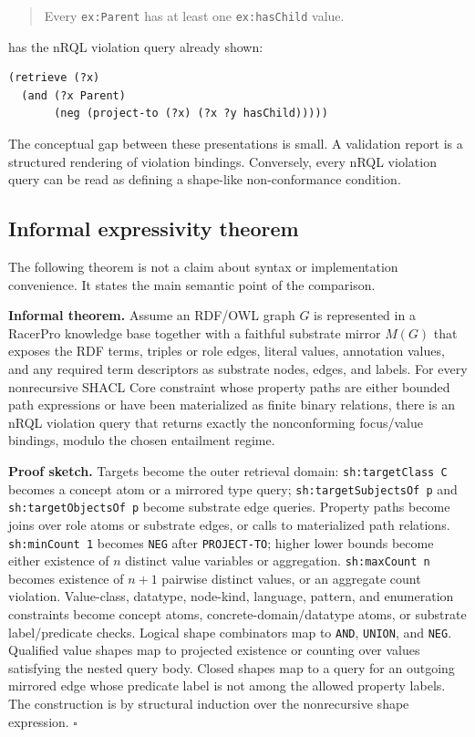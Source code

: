 \documentclass[11pt,letterpaper]{article}
\newcommand{\nrql}{nRQL}
\newcommand{\racer}{RacerPro}
\newcommand{\shacl}{SHACL}
\newcommand{\rdf}{RDF}
\newcommand{\owl}{OWL}
\begin{document}
\begin{quote}
Every \texttt{ex:Parent} has at least one \texttt{ex:hasChild} value.
\end{quote}

has the \nrql{} violation query already shown:

\begin{lstlisting}[language=nrql]
(retrieve (?x)
  (and (?x Parent)
       (neg (project-to (?x) (?x ?y hasChild)))))
\end{lstlisting}

The conceptual gap between these presentations is small. A validation report is a structured rendering of violation bindings. Conversely, every \nrql{} violation query can be read as defining a shape-like non-conformance condition.

\subsection{Informal expressivity theorem}

The following theorem is not a claim about syntax or implementation convenience. It states the main semantic point of the comparison.

\medskip
\noindent\textbf{Informal theorem.}
Assume an \rdf{}/\owl{} graph $G$ is represented in a \racer{} knowledge base together with a faithful substrate mirror $M(G)$ that exposes the \rdf{} terms, triples or role edges, literal values, annotation values, and any required term descriptors as substrate nodes, edges, and labels. For every nonrecursive \shacl{} Core constraint whose property paths are either bounded path expressions or have been materialized as finite binary relations, there is an \nrql{} violation query that returns exactly the nonconforming focus/value bindings, modulo the chosen entailment regime.

\medskip
\noindent\textbf{Proof sketch.}
Targets become the outer retrieval domain: \texttt{sh:targetClass C} becomes a concept atom or a mirrored type query; \texttt{sh:targetSubjectsOf p} and \texttt{sh:targetObjectsOf p} become substrate edge queries. Property paths become joins over role atoms or substrate edges, or calls to materialized path relations. \texttt{sh:minCount 1} becomes \texttt{NEG} after \texttt{PROJECT-TO}; higher lower bounds become either existence of $n$ distinct value variables or aggregation. \texttt{sh:maxCount n} becomes existence of $n+1$ pairwise distinct values, or an aggregate count violation. Value-class, datatype, node-kind, language, pattern, and enumeration constraints become concept atoms, concrete-domain/datatype atoms, or substrate label/predicate checks. Logical shape combinators map to \texttt{AND}, \texttt{UNION}, and \texttt{NEG}. Qualified value shapes map to projected existence or counting over values satisfying the nested query body. Closed shapes map to a query for an outgoing mirrored edge whose predicate label is not among the allowed property labels. The construction is by structural induction over the nonrecursive shape expression. \hfill $\square$
\end{document}
